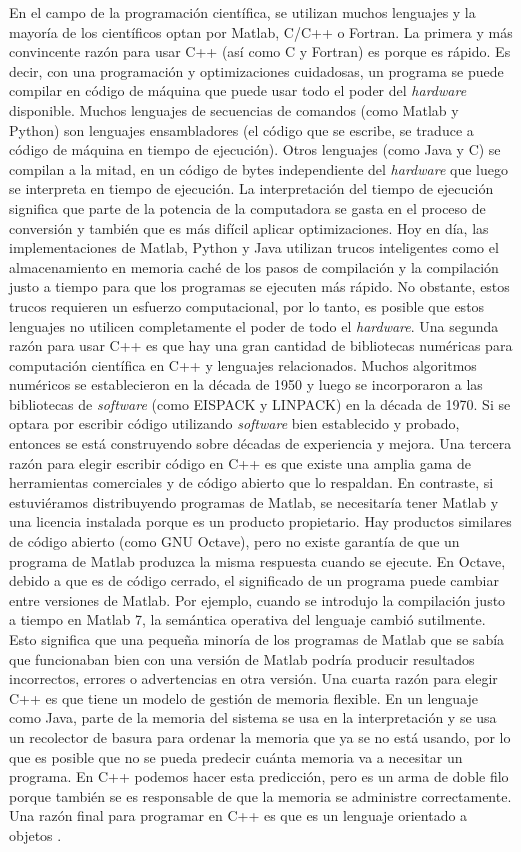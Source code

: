 En el campo de la programación científica, se utilizan muchos lenguajes y la mayoría de los científicos optan por Matlab, C/C++ o Fortran. La primera y más convincente razón para usar C++ (así como C y Fortran) es porque es rápido. Es decir, con una programación y optimizaciones cuidadosas, un programa se puede compilar en código de máquina que puede usar todo el poder del \textit{hardware} disponible. Muchos lenguajes de secuencias de comandos (como Matlab y Python) son lenguajes ensambladores (el código que se escribe, se traduce a código de máquina en tiempo de ejecución). Otros lenguajes (como Java y C) se compilan a la mitad, en un código de bytes independiente del \textit{hardware} que luego se interpreta en tiempo de ejecución. La interpretación del tiempo de ejecución significa que parte de la potencia de la computadora se gasta en el proceso de conversión y también que es más difícil aplicar optimizaciones. Hoy en día, las implementaciones de Matlab, Python y Java utilizan trucos inteligentes como el almacenamiento en memoria caché de los pasos de compilación y la compilación justo a tiempo para que los programas se ejecuten más rápido. No obstante, estos trucos requieren un esfuerzo computacional, por lo tanto, es posible que estos lenguajes no utilicen completamente el poder de todo el \textit{hardware}. Una segunda razón para usar C++ es que hay una gran cantidad de bibliotecas numéricas para computación científica en C++ y lenguajes relacionados. Muchos algoritmos numéricos se establecieron en la década de 1950 y luego se incorporaron a las bibliotecas de \textit{software} (como EISPACK y LINPACK) en la década de 1970. Si se optara por escribir código utilizando \textit{software} bien establecido y probado, entonces se está construyendo sobre décadas de experiencia y mejora. Una tercera razón para elegir escribir código en C++ es que existe una amplia gama de herramientas comerciales y de código abierto que lo respaldan. En contraste, si estuviéramos distribuyendo programas de Matlab, se necesitaría tener Matlab y una licencia instalada porque es un producto propietario. Hay productos similares de código abierto (como GNU Octave), pero no existe garantía de que un programa de Matlab produzca la misma respuesta cuando se ejecute. En Octave, debido a que es de código cerrado, el significado de un programa puede cambiar entre versiones de Matlab. Por ejemplo, cuando se introdujo la compilación justo a tiempo en Matlab 7, la semántica operativa del lenguaje cambió sutilmente. Esto significa que una pequeña minoría de los programas de Matlab que se sabía que funcionaban bien con una versión de Matlab podría producir resultados incorrectos, errores o advertencias en otra versión. Una cuarta razón para elegir C++ es que tiene un modelo de gestión de memoria flexible. En un lenguaje como Java, parte de la memoria del sistema se usa en la interpretación y se usa un recolector de basura para ordenar la memoria que ya se no está usando, por lo que es posible que no se pueda predecir cuánta memoria va a necesitar un programa. En C++ podemos hacer esta predicción, pero es un arma de doble filo porque también se es responsable de que la memoria se administre correctamente. Una razón final para programar en C++ es que es un lenguaje orientado a objetos \cite{Pitt2017}. 

